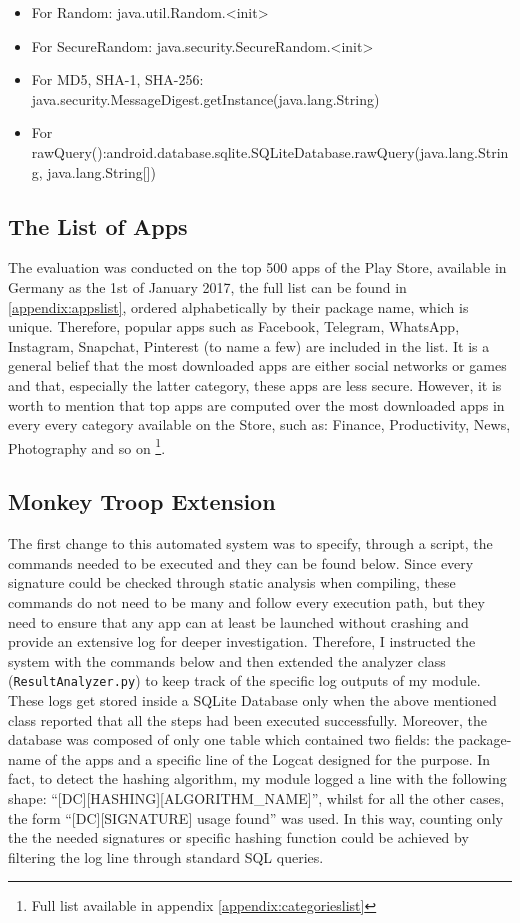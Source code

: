 \begin{itemize}
	\label{it:signs}
	\item{For Random: java.util.Random.\textless init\textgreater}
	\item{For SecureRandom: java.security.SecureRandom.\textless init\textgreater}
	\item{For MD5, SHA-1, SHA-256: java.security.MessageDigest.getInstance(java.lang.String)}
	\item{For rawQuery():\newline android.database.sqlite.SQLiteDatabase.rawQuery(java.lang.String, java.lang.String[])}
\end{itemize}

\subsection{The List of Apps}
The evaluation was conducted on the top 500 apps of the Play Store, available in Germany as the 1st of January 2017, the full list can be found in \ref{appendix:appslist}, ordered alphabetically by their package name, which is unique. Therefore, popular apps such as Facebook, Telegram, WhatsApp, Instagram, Snapchat, Pinterest (to name a few) are included in the list. It is a general belief that the most downloaded apps are either social networks or games and that, especially the latter category, these apps are less secure. However, it is worth to mention that top apps are computed over the most downloaded apps in every every category available on the Store, such as: Finance, Productivity, News, Photography and so on \footnote{Full list available in appendix \ref{appendix:categorieslist}}.

\subsection{Monkey Troop Extension}
The first change to this automated system was to specify, through a script, the commands needed to be executed and they can be found below. Since every signature could be checked through static analysis when compiling, these commands do not need to be many and follow every execution path, but they need to ensure that any app can at least be launched without crashing and provide an extensive log for deeper investigation. Therefore, I instructed the system with the commands below and then extended the analyzer class (\texttt{ResultAnalyzer.py}) to keep track of the specific log outputs of my module. These logs get stored inside a SQLite Database only when the above mentioned class reported that all the steps had been executed successfully. Moreover, the database was composed of only one table which contained two fields: the package-name of the apps and a specific line of the Logcat designed for the purpose. In fact, to detect the hashing algorithm, my module logged a line with the following shape: \enquote{[DC][HASHING][ALGORITHM\_NAME]}, whilst for all the other cases, the form \enquote{[DC][SIGNATURE] usage found} was used. In this way, counting only the the needed signatures or specific hashing function could be achieved by filtering the log line through standard SQL queries.

